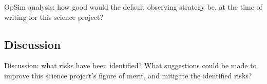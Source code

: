 OpSim analysis: how good would the default observing strategy be, at
the time of writing for this science project?



\subsection{Discussion}
\label{sec:\secname:discussion}

Discussion: what risks have been identified? What suggestions could be
made to improve this science project's figure of merit, and mitigate
the identified risks?



\navigationbar
